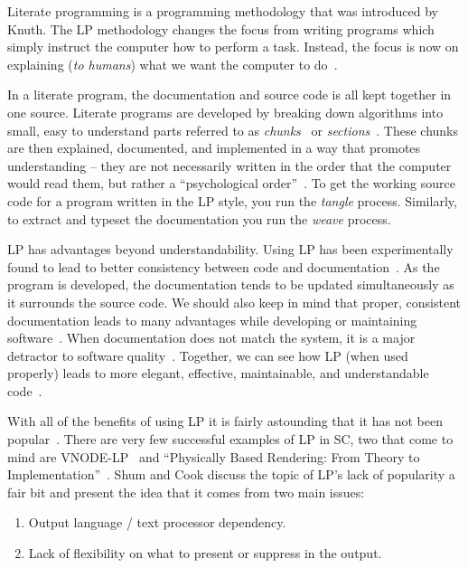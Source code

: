 \documentclass[preprint, 10pt]{sigplanconf}
\begin{document}
Literate programming is a programming methodology that was introduced by Knuth.
The LP methodology changes the focus from writing programs which simply instruct
the computer how to perform a task. Instead, the focus is now on explaining
(\emph{to humans}) what we want the computer to do~\cite{Knuth1984}.

In a literate program, the documentation and source code is all kept together in
one source. Literate programs are developed by breaking down algorithms into
small, easy to understand parts referred to as
\emph{chunks}~\cite{JohnsonAndJohnson1997} or \emph{sections}~\cite{Knuth1984}.
These chunks are then explained, documented, and implemented in a way that
promotes understanding -- they are not necessarily written in the order that the
computer would read them, but rather a ``psychological
order''~\cite{PieterseKourieAndBoake2004}. To get the working source code for a
program written in the LP style, you run the \emph{tangle} process. Similarly,
to extract and typeset the documentation you run the \emph{weave} process.

LP has advantages beyond understandability. Using LP has been experimentally
found to lead to better consistency between code and
documentation~\cite{ShumAndCook1993}. As the program is developed, the
documentation tends to be updated simultaneously as it surrounds the source
code. We should also keep in mind that proper, consistent documentation leads to
many advantages while developing or maintaining software~\cite{Heyman1990,
Kotula2000}. When documentation does not match the system, it is a major
detractor to software quality~\cite{Kotula2000, Thimbleby1986}. Together, we can
see how LP (when used properly) leads to more elegant, effective, maintainable,
and understandable code~\cite{PieterseKourieAndBoake2004}.

With all of the benefits of using LP it is fairly astounding that it has not
been popular~\cite{ShumAndCook1993}. There are very few successful examples of
LP in SC, two that come to mind are VNODE-LP~\cite{Nedialkov2006} and
``Physically Based Rendering: From Theory to
Implementation''~\cite{PharrAndHumphreys2004}. Shum and Cook discuss the topic
of LP's lack of popularity a fair bit and present the idea that it comes from
two main issues:

\begin{enumerate}
\item Output language / text processor dependency.
\item Lack of flexibility on what to present or suppress in the output.
\end{enumerate}
\end{document}
